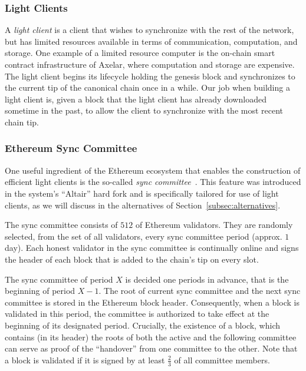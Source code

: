 \subsubsection{Light Clients}

A \emph{light client} is a client that wishes to synchronize with the rest
of the network, but has limited resources available in terms of communication,
computation, and storage. One example of a limited resource computer is the
on-chain smart contract infrastructure of Axelar, where computation and storage
are expensive. The light client begins its lifecycle holding the genesis block
and synchronizes to the current tip of the canonical chain once in a while.
Our job when building a light client is, given a block that the light client
has already downloaded sometime in the past, to allow the client to
synchronize with the most recent chain tip.

\subsubsection{Ethereum Sync Committee}\label{subsec:sync-committee}

One useful ingredient of the Ethereum ecosystem that enables the
construction of efficient light clients is the so-called \emph{sync committee}~\cite{sync-committee}.
This feature was introduced in the system's
``Altair'' hard fork and is specifically tailored for use of light clients, as
we will discuss in the alternatives of Section~\ref{subsec:alternatives}.

The sync committee consists of $512$ of Ethereum validators. They are randomly
selected, from the set of all validators, every sync committee period (approx.
$1$ day). Each honest validator in the sync committee is continually online and
signs the header of each block that is added to the chain's tip on every slot. 

The sync committee of period $X$ is decided one periods in advance,
that is the beginning of period $X-1$. The root of current sync committee and 
the next sync committee is stored in the Ethereum block header. 
Consequently, when a block is validated in
this period, the committee is authorized to take effect at the beginning of its
designated period. Crucially, the existence of a block, which contains (in its
header) the roots of both the active and the following committee can serve as
proof of the ``handover'' from one committee to the other. Note that a block is
validated if it is signed by at least $\frac{2}{3}$ of all committee members.


